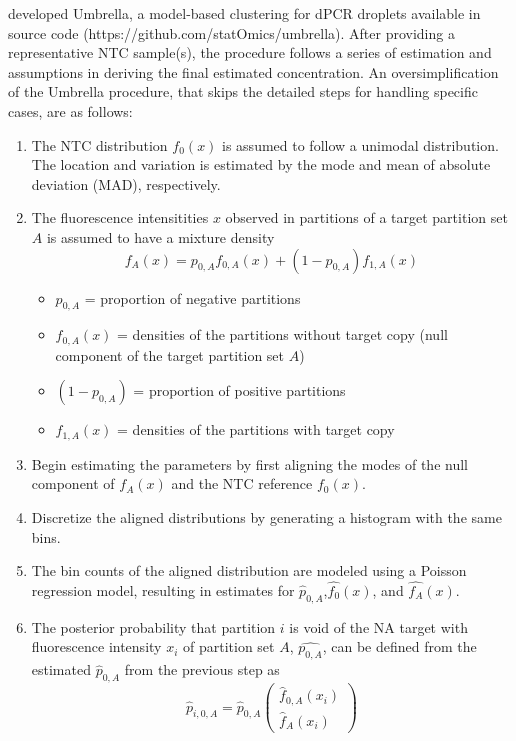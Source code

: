  developed Umbrella, a model-based clustering for dPCR droplets available in source code (https://github.com/statOmics/umbrella). After providing a representative NTC sample(s), the procedure follows a series of estimation and assumptions in deriving the final estimated concentration. An oversimplification of the Umbrella procedure, that skips the detailed steps for handling specific cases, are as follows:
\begin{enumerate}
    \item The NTC distribution \(f_0(x)\) is assumed to follow a unimodal distribution. The location and variation is estimated by the mode and mean of absolute deviation (MAD), respectively.
    \item The fluorescence intensitities \(x\) observed in partitions of a target partition set \(A\) is assumed to have a mixture density 
    \[f_A(x) = p_{0,A}f_{0,A}(x) + (1-p_{0,A})f_{1,A}(x)\]
    \begin{itemize}
        \item \(p_{0,A}\) = proportion of negative partitions
        \item \(f_{0,A}(x)\) = densities of the partitions without target copy (null component of the target partition set \(A\))
        \item \((1-p_{0,A})\) = proportion of positive partitions
        \item \(f_{1,A}(x)\) = densities of the partitions with target copy
    \end{itemize}
    \item Begin estimating the parameters by first aligning the modes of  the null component of \(f_A(x)\) and the NTC reference \(f_0(x)\).
    \item Discretize the aligned distributions by generating a histogram with the same bins.
    \item The bin counts of the aligned distribution are modeled using a Poisson regression model, resulting in estimates for \(\hat{p}_{0,A}\),\(\hat{f_{0}}(x)\), and \(\hat{f_{A}}(x)\).
    \item The posterior probability that partition \(i\) is void of the NA target with fluorescence intensity \(x_i\) of partition set \(A\), \(\hat{p_{0,A}}\), can be defined from the estimated \(\hat{p}_{0,A}\) from the previous step as
    \[ \hat{p}_{i,0,A}=\hat{p}_{0,A}\left(\begin{array}{c}\hat{f}_{0,A}(x_i)\\ \hat{f}_{A}(x_i)\end{array}\right) \]

\end{enumerate}
